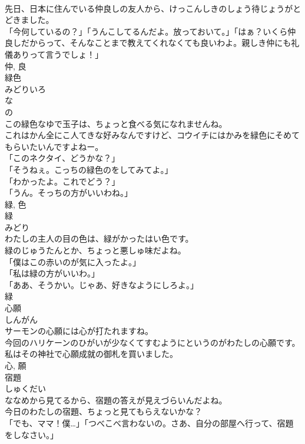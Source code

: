 \documentclass[8pt]{extreport}
\begin{document}
\begin{CJK}{UTF8}{min}
\\	先日、日本に住んでいる仲良しの友人から、けっこんしきのしょう待じょうがとどきました。	
\\	「今何しているの？」「うんこしてるんだよ。放っておいて。」「はぁ？いくら仲良しだからって、そんなことまで教えてくれなくても良いわよ。親しき仲にも礼儀ありって言うでしょ！」	
\\	仲, 良	
\\	緑色	
\\	みどりいろ	
\\	な 
\\	の 
\\	この緑色なゆで玉子は、ちょっと食べる気になれませんね。	
\\	これはかん全にこ人てきな好みなんですけど、コウイチにはかみを緑色にそめてもらいたいんですよねー。	
\\	「このネクタイ、どうかな？」 
\\	「そうねぇ。こっちの緑色のをしてみてよ。」 
\\	「わかったよ。これでどう？」 
\\	「うん。そっちの方がいいわね。」	
\\	緑, 色	
\\	緑	
\\	みどり	
\\	わたしの主人の目の色は、緑がかったはい色です。	
\\	緑のじゅうたんとか、ちょっと悪しゅ味だよね。	
\\	「僕はこの赤いのが気に入ったよ。」 
\\	「私は緑の方がいいわ。」 
\\	「ああ、そうかい。じゃあ、好きなようにしろよ。」	
\\	緑	
\\	心願	
\\	しんがん	
\\	サーモンの心願には心が打たれますね。	
\\	今回のハリケーンのひがいが少なくてすむようにというのがわたしの心願です。	
\\	私はその神社で心願成就の御札を買いました。	
\\	心, 願	
\\	宿題	
\\	しゅくだい	
\\	ななめから見てるから、宿題の答えが見えづらいんだよね。	
\\	今日のわたしの宿題、ちょっと見てもらえないかな？	
\\	「でも、ママ！僕…」「つべこべ言わないの。さあ、自分の部屋へ行って、宿題をしなさい。」	

\end{CJK}
\end{document}
